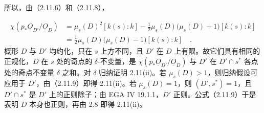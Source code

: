 
所以，由（2.11.6）和（2.11.8），

\begin{equation}\tag{2.11.9}
\begin{aligned}
\chi(p_*\underline{O}_{D'}/\underline{O}_D)
&=\mu_s(D)^2[k(s):k]
-\frac12\mu_s(D)\bigl(\mu_s(D)+1\bigr)[k(s):k]\\
&=\frac12\mu_s(D)\bigl(\mu_s(D)-1\bigr)[k(s):k] \quad .
\end{aligned}
\end{equation}
概形 $D$ 与 $D'$ 均约化，只在 $s$ 上方不同，且 $D'$ 在 $D$ 上有限。故它们具有相同的正规化，$D$ 在 $s$ 处的奇点的 $\delta$-不变量，是 $\chi(p_*\underline{O}_{D'}/\underline{O}_D)$ 与 $D'$ 在 $D'\cap s^*$ 各点处的奇点不变量 $\delta$ 之和。对 $\delta$ 归纳证明 2.11(ii)。若 $\mu_s(D)>1$，则归纳假设可应用于 $D'$，由（2.11.9）即得 2.11(ii)。若 $\mu_s(D)=1$，则 $(D',s^*)=1$，且 $D'\cap s^*$ 是 $D'$ 上的正则除子；由 EGA IV 19.1.1，$D'$ 正则。公式（2.11.9）于是表明 $D$ 本身也正则，再由 2.8 即得 2.11(ii)。

